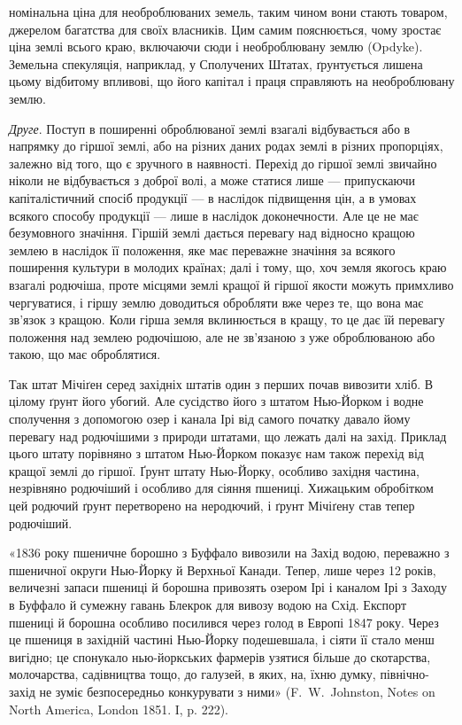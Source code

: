 \parcont{}  %
номінальна ціна для необроблюваних земель, таким чином вони стають товаром,
джерелом багатства для своїх власників. Цим самим пояснюється, чому зростає ціна
землі всього краю, включаючи сюди і необроблювану землю (Opdyke).
Земельна спекуляція, наприклад, у Сполучених Штатах, ґрунтується лишена цьому
відбитому впливові, що його капітал і праця справляють на необроблювану землю.

\emph{Друге}. Поступ в поширенні оброблюваної землі взагалі відбувається або в
напрямку до гіршої землі, або на різних даних родах землі в різних пропорціях,
залежно від того, що є зручного в наявності. Перехід до гіршої землі звичайно
ніколи не відбувається з доброї волі, а може статися лише — припускаючи капіталістичний спосіб
продукції — в наслідок підвищення цін, а в умовах всякого
способу продукції — лише в наслідок доконечности. Але це не має безумовного значіння. Гіршій землі
дається перевагу над відносно кращою землею в наслідок
її положення, яке має переважне значіння за всякого поширення культури
в молодих країнах; далі і тому, що, хоч земля якогось краю взагалі родючіша,
проте місцями землі кращої й гіршої якости можуть примхливо чергуватися, і
гіршу землю доводиться обробляти вже через те, що вона має зв’язок з кращою.
Коли гірша земля вклинюється в кращу, то це дає їй перевагу положення
над землею родючішою, але не зв’язаною з уже оброблюваною або такою, що має
оброблятися.

Так штат Мічіґен серед західніх штатів один з перших почав вивозити
хліб. В цілому ґрунт його убогий. Але сусідство його з штатом Нью-Йорком і
водне сполучення з допомогою озер і канала Ірі від самого початку давало йому
перевагу над родючішими з природи штатами, що лежать далі на захід.
Приклад цього штату порівняно з штатом Нью-Йорком показує нам також
перехід від кращої землі до гіршої. Ґрунт штату Нью-Йорку, особливо західня
частина, незрівняно родючіший і особливо для сіяння пшениці. Хижацьким обробітком
цей родючий ґрунт перетворено на неродючий, і ґрунт Мічіґену став тепер
родючіший.

«1836 року пшеничне борошно з Буффало вивозили на Захід водою, переважно
з пшеничної округи Нью-Йорку й Верхньої Канади. Тепер, лише через
12 років, величезні запаси пшениці й борошна привозять озером Ірі і каналом
Ірі з Заходу в Буффало й сумежну гавань Блекрок для вивозу водою на
Схід. Експорт пшениці й борошна особливо посилився через голод в Европі
1847 року. Через це пшениця в західній частині Нью-Йорку подешевшала, і
сіяти її стало менш вигідно; це спонукало нью-йоркських фармерів узятися
більше до скотарства, молочарства, садівництва тощо, до галузей, в яких, на,
їхню думку, північно-захід не зуміє безпосередньо конкурувати з ними» (F.~W.~Johnston, Notes on North America, London 1851. I, p. 222).

